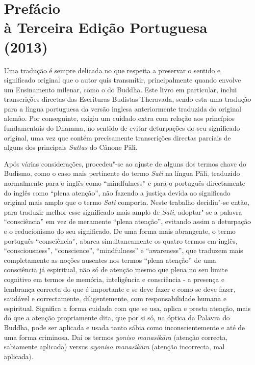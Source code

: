 \chapter[Prefácio à Terceira Edição Portuguesa (2013)]{Prefácio\\ à Terceira Edição Portuguesa\\ (2013)}

Uma tradução é sempre delicada no que respeita a preservar o sentido e
significado original que o autor quis transmitir, principalmente quando envolve
um Ensinamento milenar, como o do Buddha. Este livro em particular, inclui
transcrições directas das Escrituras Budistas Theravada, sendo esta uma tradução
para a língua portuguesa da versão inglesa anteriormente traduzida do original
alemão. Por conseguinte, exigiu um cuidado extra com relação aos princípios
fundamentais do Dhamma, no sentido de evitar deturpações do seu significado
original, uma vez que contém precisamente transcrições directas parciais de
alguns dos principais \emph{Suttas} do Cânone Pāli.

Após várias considerações, procedeu"-se ao ajuste de alguns dos termos chave do
Budismo, como o caso mais pertinente do termo \emph{Sati} na língua Pāli,
traduzido normalmente para o inglês como ``mindfulness'' e para o português
directamente do inglês como ``plena atenção'', não fazendo a justiça devida ao
significado original mais amplo que o termo \emph{Sati} comporta. Neste trabalho
decidiu"-se então, para traduzir melhor esse significado mais amplo de
\emph{Sati}, adoptar"-se a palavra ``consciência'' em vez de meramente ``plena
atenção'', evitando assim a deturpação e o reducionismo do seu significado. De
uma forma mais abrangente, o termo português ``consciência'', abarca
simultaneamente os quatro termos em inglês, ``consciousness'', ``conscience'',
``mindfulness'' e ``awareness'', que traduzem mais completamente as noções
ausentes nos termos ``plena atenção'' de uma consciência já espiritual, não só
de atenção mesmo que plena no seu limite cognitivo em termos de memória,
inteligência e consciência - a presença e lembrança correcta do que é importante
e se deve fazer e como se deve fazer, saudável e correctamente, diligentemente,
com responsabilidade humana e espiritual. Significa a forma cuidada com que se
usa, aplica e presta atenção, mais do que a atenção propriamente dita, que por
si só, na óptica da Palavra do Buddha, pode ser aplicada e usada tanto sábia
como inconscientemente e até de uma forma criminosa. Daí os termos \emph{yoniso
  manasikāra} (atenção correcta, sabiamente aplicada) versus \emph{ayoniso
  manasikāra} (atenção incorrecta, mal aplicada).

